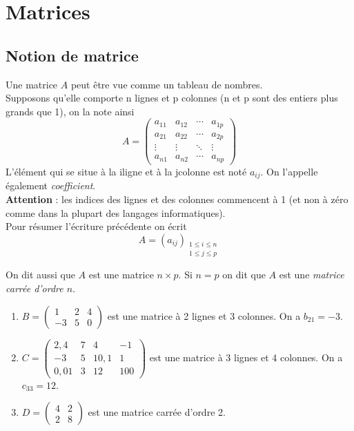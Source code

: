 \documentclass[a4paper,12pt]{book}
\begin{document}
\chapter*{Matrices}
\section{Notion de matrice}

\begin{definition}[ : matrice]
Une matrice $A$ peut être vue comme \og un tableau de nombres\fg{}.\\
Supposons qu'elle comporte n lignes et p colonnes (n et p sont des entiers plus grands que 1), on la note ainsi
$$A = \begin{pmatrix}
    a_{11}      & a_{12}&\cdots & a_{1p} \\ 
    a_{21}  & a_{22}& \cdots & a_{2p} \\      
    \vdots 	& \vdots & \ddots & \vdots \\ 
    a_{n1}  & a_{n2}    & \cdots & a_{np}
\end{pmatrix}$$
L'élément qui se situe à la i\eme ligne et à la j\eme colonne est noté $a_{ij}$. On l'appelle également \textit{coefficient}.\\

\textbf{Attention} : les indices des lignes et des colonnes commencent à 1 (et non à zéro comme dans la plupart des langages informatiques).\\

Pour résumer l'écriture précédente on écrit 
$$A=(a_{ij})_{\substack{1\leqslant i\leqslant n\\1\leqslant j\leqslant p}}$$

On dit aussi que $A$ est une matrice $n\times p$. Si $n=p$ on dit que $A$ est une \textit{matrice carrée d'ordre $n$}.
\end{definition}

\begin{exemple}[s]
\begin{enumerate}[--]
	\item 	$B =	\begin{pmatrix}
					    1      & 2 & 4 \\ 
					    -3  & 5 & 0
					\end{pmatrix}$ est une matrice à 2 lignes et 3 colonnes. On a $b_{21}=-3$.
	\item 	$C =	\begin{pmatrix}
						    2,4      & 7 & 4 & -1 \\ 
						    -3  & 5 & 10,1 & 1 \\
						    0,01 & 3 & 12 & 100
						\end{pmatrix}$ est une matrice à 3 lignes et 4 colonnes. On a $c_{33}=12$.
	\item 	$D =	\begin{pmatrix}
							    4      & 2\\ 
							    2  &8
							\end{pmatrix}$ est une matrice carrée d'ordre 2.
							
	
\end{enumerate}
\end{exemple}
\end{document}
